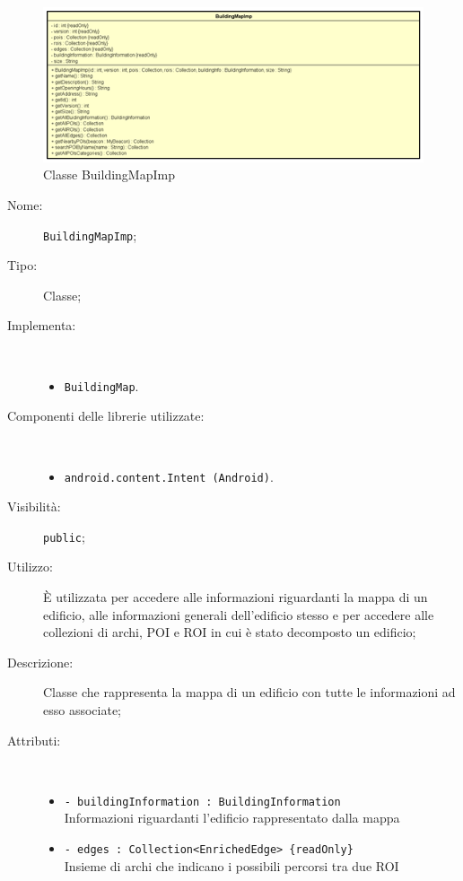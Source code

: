 \documentclass[../DefinizioneDiProdotto.tex]{subfiles}
\begin{document}
    \begin{figure}[H]
        \centering
        \includegraphics{img/BuildingMapImp.png}
        \caption{Classe BuildingMapImp}\label{fig:model::navigator::BuildingMapImp} 
    \end{figure}
    \begin{description}
\item[Nome:] \texttt{BuildingMapImp};
\item[Tipo:] Classe;
\item[Implementa:] \
\begin{itemize}
\item \texttt{BuildingMap}.

\end{itemize}
\item[Componenti delle librerie utilizzate:] \
\begin{itemize}
\item \texttt{android.content.Intent (Android)}.

\end{itemize}
\item[Visibilità:] \texttt{public};
\item[Utilizzo:] È utilizzata per accedere alle informazioni riguardanti la mappa di un edificio, alle informazioni generali dell'edificio stesso e per accedere alle collezioni di archi, POI e ROI in cui è stato decomposto un edificio;
\item[Descrizione:] Classe che rappresenta la mappa di un edificio con tutte le informazioni ad esso associate;
\item[Attributi:] \
\begin{itemize}
\item \texttt{- buildingInformation : BuildingInformation}\\
Informazioni riguardanti l'edificio rappresentato dalla mappa

\item \texttt{- edges : Collection<EnrichedEdge> \{readOnly\}}\\
Insieme di archi che indicano i possibili percorsi tra due ROI


\end{itemize}
\end{description}
\end{document}
